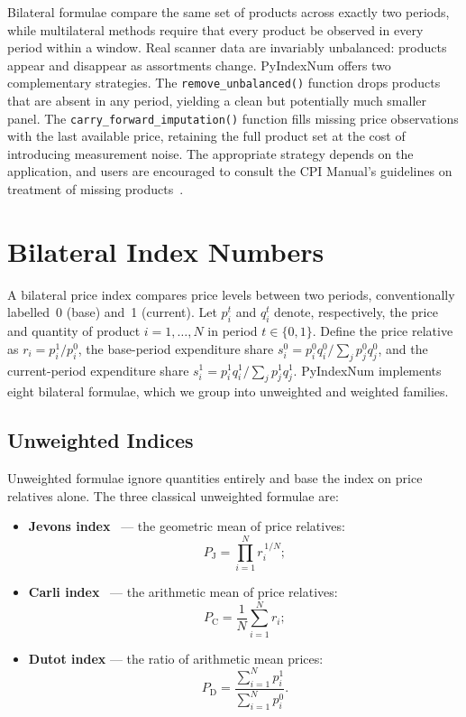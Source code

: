 \documentclass[12pt,a4paper]{article}
\begin{document}
Bilateral formulae compare the same set of products across exactly two periods, while multilateral methods require that every product be observed in every period within a window. Real scanner data are invariably unbalanced: products appear and disappear as assortments change. PyIndexNum offers two complementary strategies. The \texttt{remove\_unbalanced()} function drops products that are absent in any period, yielding a clean but potentially much smaller panel. The \texttt{carry\_forward\_imputation()} function fills missing price observations with the last available price, retaining the full product set at the cost of introducing measurement noise. The appropriate strategy depends on the application, and users are encouraged to consult the CPI Manual's guidelines on treatment of missing products~\autocite{iLO2004cpimanual}.

\section{Bilateral Index Numbers}
\label{sec:bilateral}

A bilateral price index compares price levels between two periods, conventionally labelled~0 (base) and~1 (current). Let $p_i^t$ and $q_i^t$ denote, respectively, the price and quantity of product $i = 1, \ldots, N$ in period $t \in \{0, 1\}$. Define the price relative as $r_i = p_i^1 / p_i^0$, the base-period expenditure share $s_i^0 = p_i^0 q_i^0 / \sum_j p_j^0 q_j^0$, and the current-period expenditure share $s_i^1 = p_i^1 q_i^1 / \sum_j p_j^1 q_j^1$. PyIndexNum implements eight bilateral formulae, which we group into unweighted and weighted families.

\subsection{Unweighted Indices}

Unweighted formulae ignore quantities entirely and base the index on price relatives alone. The three classical unweighted formulae are:

\begin{itemize}[nosep]
  \item \textbf{Jevons index}~\autocite{jevons1865variation} --- the geometric mean of price relatives:
    \[
      P_{\mathrm{J}} = \prod_{i=1}^{N} r_i^{\,1/N};
    \]
  \item \textbf{Carli index}~\autocite{carli1804valore} --- the arithmetic mean of price relatives:
    \[
      P_{\mathrm{C}} = \frac{1}{N} \sum_{i=1}^{N} r_i;
    \]
  \item \textbf{Dutot index} --- the ratio of arithmetic mean prices:
    \[
      P_{\mathrm{D}} = \frac{\sum_{i=1}^{N} p_i^1}{\sum_{i=1}^{N} p_i^0}.
    \]
\end{itemize}
\end{document}
